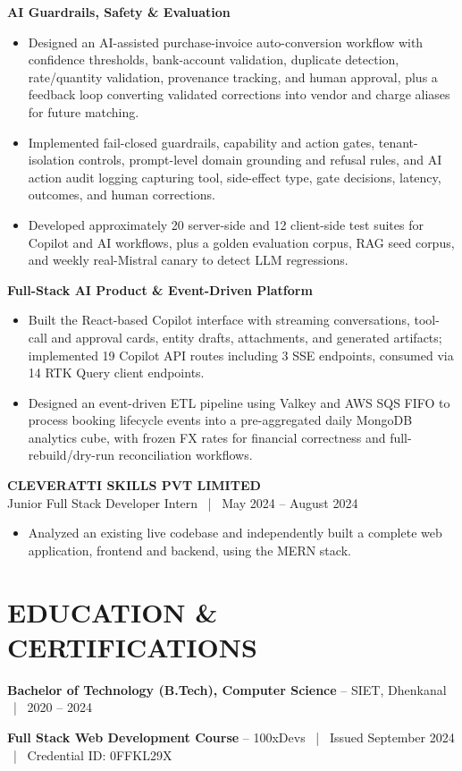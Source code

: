 \documentclass[letterpaper,9pt]{extarticle}
\newcommand{\role}[2]{%
  \textbf{\large #1}\\[1pt]
  {\color{graytext}#2}\par\vspace{1.5pt}}
\newcommand{\subhead}[1]{\vspace{2.5pt}\textbf{\color{accent}#1}\par\vspace{1pt}}
\newenvironment{points}
  {\begin{itemize}[leftmargin=11pt,itemsep=1.1pt,parsep=0pt,topsep=1pt,
                   partopsep=0pt,label=\textbullet]}
  {\end{itemize}}
\begin{document}
\subhead{AI Guardrails, Safety \& Evaluation}
\begin{points}
  \item Designed an AI-assisted purchase-invoice auto-conversion workflow with confidence thresholds,
        bank-account validation, duplicate detection, rate/quantity validation, provenance tracking, and human
        approval, plus a feedback loop converting validated corrections into vendor and charge aliases for future
        matching.
  \item Implemented fail-closed guardrails, capability and action gates, tenant-isolation controls, prompt-level
        domain grounding and refusal rules, and AI action audit logging capturing tool, side-effect type, gate
        decisions, latency, outcomes, and human corrections.
  \item Developed approximately 20 server-side and 12 client-side test suites for Copilot and AI workflows, plus
        a golden evaluation corpus, RAG seed corpus, and weekly real-Mistral canary to detect LLM regressions.
\end{points}

\subhead{Full-Stack AI Product \& Event-Driven Platform}
\begin{points}
  \item Built the React-based Copilot interface with streaming conversations, tool-call and approval cards,
        entity drafts, attachments, and generated artifacts; implemented 19 Copilot API routes including 3 SSE
        endpoints, consumed via 14 RTK Query client endpoints.
  \item Designed an event-driven ETL pipeline using Valkey and AWS SQS FIFO to process booking lifecycle events
        into a pre-aggregated daily MongoDB analytics cube, with frozen FX rates for financial correctness and
        full-rebuild/dry-run reconciliation workflows.
\end{points}

\vspace{3pt}
\role{CLEVERATTI SKILLS PVT LIMITED}{Junior Full Stack Developer Intern ~|~ May 2024 -- August 2024}
\begin{points}
  \item Analyzed an existing live codebase and independently built a complete web application, frontend and
        backend, using the MERN stack.
\end{points}

\section*{EDUCATION \& CERTIFICATIONS}
\textbf{Bachelor of Technology (B.Tech), Computer Science} -- SIET, Dhenkanal ~|~ 2020 -- 2024\par\vspace{2pt}
\textbf{Full Stack Web Development Course} -- 100xDevs ~|~ Issued September 2024 ~|~ Credential ID: 0FFKL29X
\end{document}
